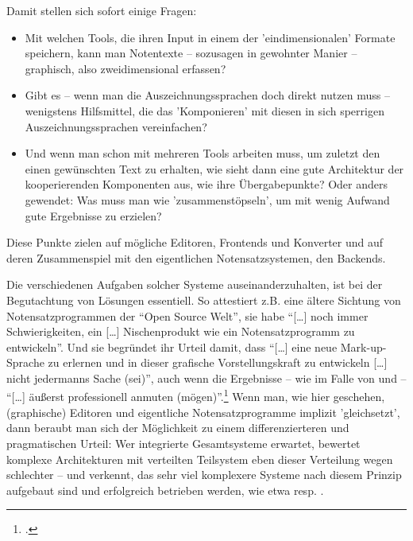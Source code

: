 Damit stellen sich sofort einige Fragen:

\begin{itemize}
  \item Mit welchen Tools, die ihren Input in einem der 'eindimensionalen'
  Formate speichern, kann man Notentexte -- sozusagen in gewohnter Manier
  -- graphisch, also zweidimensional erfassen?
  \item Gibt es -- wenn man die Auszeichnungssprachen doch direkt nutzen muss --
  wenigstens Hilfsmittel, die das 'Komponieren' mit diesen in sich sperrigen
  Auszeichnungssprachen vereinfachen?
  \item Und wenn man schon mit mehreren Tools arbeiten muss, um zuletzt den
  einen gewünschten Text zu erhalten, wie sieht dann eine gute Architektur der
  kooperierenden Komponenten aus, wie ihre Übergabepunkte? Oder anders gewendet:
  Was muss man wie 'zusammenstöpseln', um mit wenig Aufwand gute Ergebnisse zu
  erzielen?
\end{itemize}

Diese Punkte zielen auf mögliche Editoren, Frontends und Konverter und auf
deren Zusammenspiel mit den eigentlichen Notensatzsystemen, den Backends. 


Die verschiedenen Aufgaben solcher Systeme auseinanderzuhalten, ist bei der
Begutachtung von Lösungen essentiell. So attestiert z.B. eine ältere Sichtung
von Notensatzprogrammen der \enquote{Open Source Welt}, sie habe
\enquote{[\ldots] noch immer Schwierigkeiten, ein [\ldots] Nischenprodukt wie
ein Notensatzprogramm zu entwickeln}. Und sie begründet ihr Urteil damit, dass
\enquote{[\ldots] eine neue Mark-up-Sprache zu erlernen und in dieser grafische
Vorstellungskraft zu entwickeln [\ldots] nicht jedermanns Sache (sei)}, auch
wenn die Ergebnisse -- wie im Falle von  und  --
\enquote{[\ldots] äußerst professionell anmuten
(mögen)}.\footcite[vgl.][51]{Albrecht2009a} Wenn man, wie hier geschehen,
(graphische) Editoren und eigentliche Notensatzprogramme implizit 'gleichsetzt',
dann beraubt man sich der Möglichkeit zu einem differenzierteren und
pragmatischen Urteil: Wer integrierte Gesamtsysteme erwartet, bewertet komplexe
Architekturen mit verteilten Teilsystem eben dieser Verteilung wegen schlechter
-- und verkennt, das sehr viel komplexere Systeme nach diesem Prinzip aufgebaut
sind und erfolgreich betrieben werden, wie etwa  resp.
.

